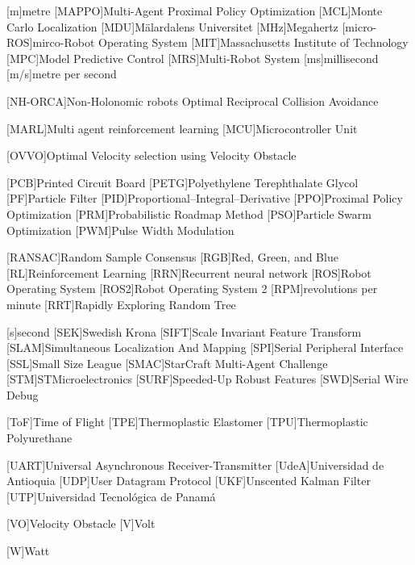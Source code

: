 \begin{acronym}[HBCI]
	{metre}
	[MAPPO]{Multi-Agent Proximal Policy Optimization}
	[MCL]{Monte Carlo Localization}
	[MDU]{Mälardalens Universitet}
	[MHz]{Megahertz}
	[micro-ROS]{mirco-Robot Operating System}
	[MIT]{Massachusetts Institute of Technology}
	[MPC]{Model Predictive Control}
	[MRS]{Multi-Robot System}
	[ms]{millisecond}
	[m/s]{metre per second}

	[NH-ORCA]{Non-Holonomic robots Optimal Reciprocal Collision Avoidance}

	[MARL]{Multi agent reinforcement learning}
	[MCU]{Microcontroller Unit}

	[OVVO]{Optimal Velocity selection using Velocity Obstacle}

	[PCB]{Printed Circuit Board}
	[PETG]{Polyethylene Terephthalate Glycol}
	[PF]{Particle Filter}
	[PID]{Proportional–Integral–Derivative}
	[PPO]{Proximal Policy Optimization}
	[PRM]{Probabilistic Roadmap Method}
	[PSO]{Particle Swarm Optimization}
	[PWM]{Pulse Width Modulation}


	[RANSAC]{Random Sample Consensus}
	[RGB]{Red, Green, and Blue}
	[RL]{Reinforcement Learning}
	[RRN]{Recurrent neural network}
	[ROS]{Robot Operating System}
	[ROS2]{Robot Operating System 2}
	[RPM]{revolutions per minute}
	[RRT]{Rapidly Exploring Random Tree}

	{second}
	[SEK]{Swedish Krona}
	[SIFT]{Scale Invariant Feature Transform}
	[SLAM]{Simultaneous Localization And Mapping}
	[SPI]{Serial Peripheral Interface}
	[SSL]{Small Size League}
	[SMAC]{StarCraft Multi-Agent Challenge}
	[STM]{STMicroelectronics}
	[SURF]{Speeded-Up Robust Features}
	[SWD]{Serial Wire Debug}

	[ToF]{Time of Flight}
	[TPE]{Thermoplastic Elastomer}
	[TPU]{Thermoplastic Polyurethane}

	[UART]{Universal Asynchronous Receiver-Transmitter}
	[UdeA]{Universidad de Antioquia}
	[UDP]{User Datagram Protocol}
	[UKF]{Unscented Kalman Filter}
	[UTP]{Universidad Tecnológica de Panamá}

	[VO]{Velocity Obstacle}
	{Volt}

	{Watt}



\end{acronym}

